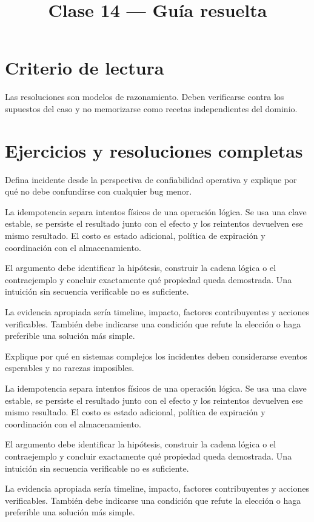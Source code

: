 \documentclass[variant=guia,cover=institutional,mode=screen]{ua-engineering-v6-article}
\title{Clase 14 --- Guía resuelta}
\author{\UAProfessor}
\date{\UADate}
\begin{document}
\section{Criterio de lectura}
Las resoluciones son modelos de razonamiento. Deben verificarse contra los supuestos del caso y no memorizarse como recetas independientes del dominio.

\section{Ejercicios y resoluciones completas}
\begin{uaexercise}
Defina incidente desde la perspectiva de confiabilidad operativa y explique por qué no debe confundirse con cualquier bug menor.
\end{uaexercise}
\begin{uaanswer}
La idempotencia separa intentos físicos de una operación lógica. Se usa una clave estable, se persiste el resultado junto con el efecto y los reintentos devuelven ese mismo resultado. El costo es estado adicional, política de expiración y coordinación con el almacenamiento.

El argumento debe identificar la hipótesis, construir la cadena lógica o el contraejemplo y concluir exactamente qué propiedad queda demostrada. Una intuición sin secuencia verificable no es suficiente.

La evidencia apropiada sería timeline, impacto, factores contribuyentes y acciones verificables. También debe indicarse una condición que refute la elección o haga preferible una solución más simple.
\end{uaanswer}

\begin{uaexercise}
Explique por qué en sistemas complejos los incidentes deben considerarse eventos esperables y no rarezas imposibles.
\end{uaexercise}
\begin{uaanswer}
La idempotencia separa intentos físicos de una operación lógica. Se usa una clave estable, se persiste el resultado junto con el efecto y los reintentos devuelven ese mismo resultado. El costo es estado adicional, política de expiración y coordinación con el almacenamiento.

El argumento debe identificar la hipótesis, construir la cadena lógica o el contraejemplo y concluir exactamente qué propiedad queda demostrada. Una intuición sin secuencia verificable no es suficiente.

La evidencia apropiada sería timeline, impacto, factores contribuyentes y acciones verificables. También debe indicarse una condición que refute la elección o haga preferible una solución más simple.
\end{uaanswer}
\end{document}
